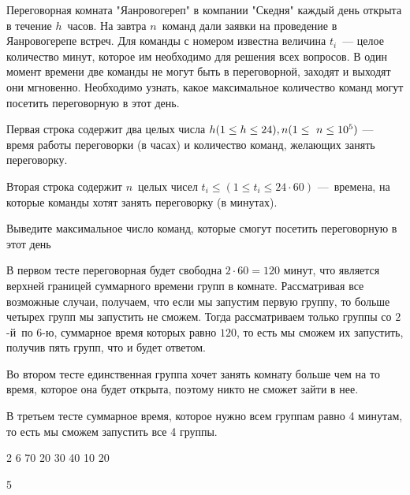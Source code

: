 
Переговорная комната "Яанровогереп" в компании "Скедня" каждый день открыта в течение $h$ часов. На завтра $n$ команд дали заявки на проведение в Яанровогерепе встреч. Для команды с номером  известна величина $t_i$ — целое количество минут, которое им необходимо для решения всех вопросов. В один момент времени две команды не могут быть в переговорной, заходят и выходят они мгновенно. Необходимо узнать, какое максимальное количество команд могут посетить переговорную в этот день.


Первая строка содержит два целых числа $h\space(1\leq h\leq 24),\space n\space(1\leq n\leq 10^5)$ — время работы переговорки (в часах) и количество команд, желающих занять переговорку.

Вторая строка содержит $n$ целых чисел $t_i\leq(1\leq t_i\leq 24\cdot 60)$ — времена, на которые команды хотят занять переговорку (в минутах).

\outputfmtSection

Выведите максимальное число команд, которые смогут посетить переговорную в этот день

\explanationSection

В первом тесте переговорная будет свободна $2\cdot 60=120$ минут, что является верхней границей суммарного времени групп в комнате. Рассматривая все возможные случаи, получаем, что если мы запустим первую группу, то больше четырех групп мы запустить не сможем. Тогда рассматриваем только группы со $2$-й по $6$-ю, суммарное время которых равно $120$, то есть мы сможем их запустить, получив пять групп, что и будет ответом.

Во втором тесте единственная группа хочет занять комнату больше чем на то время, которое она будет открыта, поэтому никто не сможет зайти в нее.

В третьем тесте суммарное время, которое нужно всем группам равно 4 минутам, то есть мы сможем запустить все 4 группы.


\begin{myverbbox}[\small]{\vinput}
    2 6
    70 20 30 40 10 20
\end{myverbbox}

\begin{myverbbox}[\small]{\voutput}
    5
\end{myverbbox}


